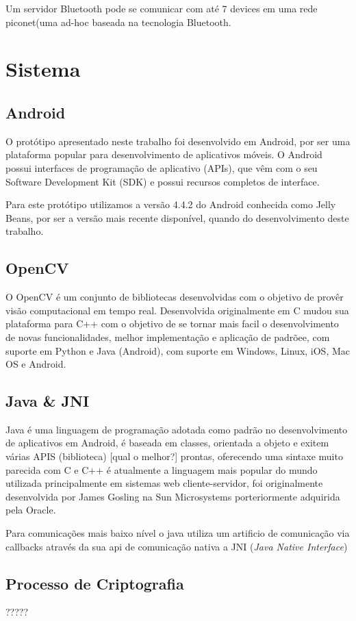 \documentclass[12pt]{article}
\begin{document}
Um servidor Bluetooth pode se comunicar com até 7 devices em uma rede piconet(uma ad-hoc baseada na tecnologia Bluetooth.
\section{Sistema}
\subsection{Android}
O protótipo apresentado neste trabalho foi desenvolvido em Android, por ser uma plataforma popular para desenvolvimento de aplicativos móveis. O Android possui interfaces de programação de aplicativo (APIs), que vêm com o seu Software Development Kit (SDK) e possui recursos completos de interface\cite{android:2014}.

Para este protótipo utilizamos a versão 4.4.2 do Android conhecida como Jelly Beans, por ser a versão mais recente disponível, quando do desenvolvimento deste trabalho. 
\subsection{OpenCV}
O OpenCV é um conjunto de bibliotecas desenvolvidas com o objetivo de provêr visão computacional em tempo real. Desenvolvida originalmente em C mudou sua plataforma para C++ com o objetivo de se tornar mais facil o desenvolvimento de novas funcionalidades, melhor implementação e aplicação de padrõee, com suporte em Python e Java (Android), com suporte em Windows, Linux, iOS, Mac OS e Android.
\subsection{Java \& JNI}
Java é uma linguagem de programação adotada como padrão no desenvolvimento de aplicativos em Android, é baseada em classes, orientada a objeto e exitem várias APIS (biblioteca) [qual o melhor?] prontas, oferecendo uma sintaxe muito parecida com C e C++ é atualmente a linguagem mais popular do mundo utilizada principalmente em sistemas web cliente-servidor, foi originalmente desenvolvida por James Gosling na Sun Microsystems porteriormente adquirida pela Oracle.

Para comunicações mais baixo nível o java utiliza um artificio de comunicação via callbacks através da sua api de comunicação nativa a JNI (\textit{Java Native Interface})
\subsection{Processo de Criptografia}
?????
\end{document}
